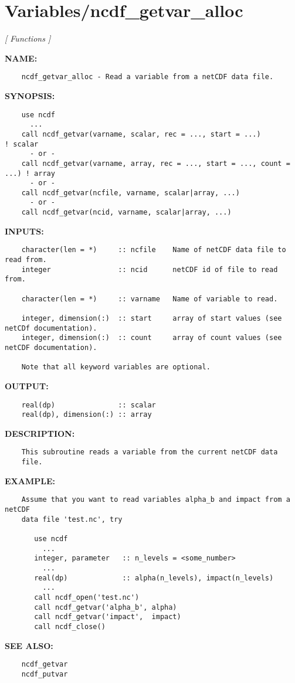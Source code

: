 \section{Variables/ncdf\_getvar\_alloc}
\textsl{[ Functions ]}

\label{ch:robo115}
\label{ch:Variables_ncdf_getvar_alloc}
\textbf{NAME:}\hspace{0.08in}\begin{Verbatim}
    ncdf_getvar_alloc - Read a variable from a netCDF data file.
\end{Verbatim}
\textbf{SYNOPSIS:}\hspace{0.08in}\begin{Verbatim}
    use ncdf
      ...
    call ncdf_getvar(varname, scalar, rec = ..., start = ...)             ! scalar
      - or -
    call ncdf_getvar(varname, array, rec = ..., start = ..., count = ...) ! array
      - or -
    call ncdf_getvar(ncfile, varname, scalar|array, ...)
      - or -
    call ncdf_getvar(ncid, varname, scalar|array, ...)
\end{Verbatim}
\textbf{INPUTS:}\hspace{0.08in}\begin{Verbatim}
    character(len = *)     :: ncfile    Name of netCDF data file to read from.
    integer                :: ncid      netCDF id of file to read from.

    character(len = *)     :: varname   Name of variable to read.

    integer, dimension(:)  :: start     array of start values (see netCDf documentation).
    integer, dimension(:)  :: count     array of count values (see netCDF documentation).

    Note that all keyword variables are optional.
\end{Verbatim}
\textbf{OUTPUT:}\hspace{0.08in}\begin{Verbatim}
    real(dp)               :: scalar
    real(dp), dimension(:) :: array
\end{Verbatim}
\textbf{DESCRIPTION:}\hspace{0.08in}\begin{Verbatim}
    This subroutine reads a variable from the current netCDF data
    file.
\end{Verbatim}
\textbf{EXAMPLE:}\hspace{0.08in}\begin{Verbatim}
    Assume that you want to read variables alpha_b and impact from a netCDF
    data file 'test.nc', try

       use ncdf
         ...
       integer, parameter   :: n_levels = <some_number>
         ...
       real(dp)             :: alpha(n_levels), impact(n_levels)
         ...
       call ncdf_open('test.nc')
       call ncdf_getvar('alpha_b', alpha)
       call ncdf_getvar('impact',  impact)
       call ncdf_close()
\end{Verbatim}
\textbf{SEE ALSO:}\hspace{0.08in}\begin{Verbatim}
    ncdf_getvar
    ncdf_putvar
\end{Verbatim}
